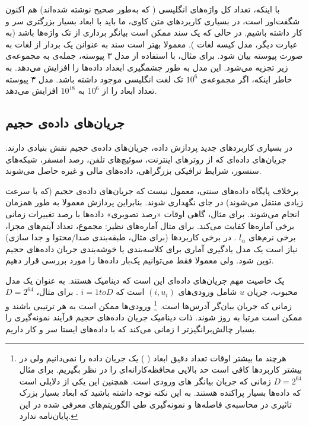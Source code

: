 با اینکه، تعداد کل واژه‌های انگلیسی ( که به‌طور صحیح نوشته شده‌اند) هم اکنون شگفت‌اور است، در بسیاری کاربردهای متن کاوی، ما باید با ابعاد بسیار بزرگتری سر و کار داشته باشیم. در حالی که یک سند ممکن است بیانگر برداری از تک واژه‌ها باشد (به عبارت دیگر، مدل کیسه لغات
). معمولا بهتر است سند به عنوانن یک بردار از لغات به صورت 
پیوسته 
\cite{litez34}
بیان شود. برای مثال، با استفاده از مدل ۳ پیوسته، جمله‌ی
به مجموعه‌ی زیر تجزیه می‌شود. 
این مدل به طور جشمگیری ابعداد داده‌ها را افزایش می‌دهد. به خاطر اینکه، اگر مجموعه‌ی 
$10^6$
تک لغت انگلیسی موجود داشته باشد. مدل ۳ پیوسته تعداد ابعاد را از 
$10^6$
به 
$10^{18}$
افزایش می‌دهد.

\subsection{
جریان‌های داده‌ی حجیم
}
در بسیاری کاربردهای جدید پردازش داده، جریان‌های داده‌ی حجیم نقش بنیادی دارند. جریان‌های داده‌ای که از روترهای اینترنت، سوئیچ‌های تلفن، رصد امسفر، شبکه‌های سنسور، شرایط ترافیکی بزرگراهی، داده‌های مالی و غیره 
\cite{litez5, litez141, litez49, litez19, litez96, litez69, litez91}
حاصل می‌شوند.

برخلاف پایگاه‌ داده‌های سنتی، معمول نیست که جریان‌های داده‌ی حجیم (که با سرعت زیادی منتقل می‌شوند) در جای نگهداری شوند. بنابراین پردازش معمولا به طور همزمان انجام می‌شوند. برای مثال، گاهی اوقات «رصد تصویری» داده‌ها با رصد تغییرات زمانی برخی آماره‌ها کفایت می‌کند. برای مثال آماره‌های نظیر: مجموع، تعداد آیتم‌های مجزا، برخی نرم‌های 
$l_\alpha$
. در برخی کاربردها (برای مثال، طبقه‌بندی صدا/محتوا و جدا سازی) نیاز است یک مدل یادگیری آماری برای کلاسه‌بندی
یا خوشه‌بندی
جریان داده‌های حجیم توین شود. ولی معمولا فقط می‌توانیم یک‌بار داده‌ها را مورد بررسی قرار دهیم.

یک خاصیت مهم جریان‌های داده‌ای این است که دینامیک هستند. به عنوان یک مدل محبوب، جریان 
$u$
شامل ورودی‌های 
$(i, u_i)$
است که 
$i = 1 to D$
. برای مثال،
$D = 2^{64}$
زمانی که جریان بیان‌گر 
آدرس‌ها است.
\footnote{
هرچند ما بیشتر اوقات تعداد دقیق ابعاد (
) یک جریان داده را نمی‌دانیم ولی در بیشتر کاربردها کافی است حد بالایی محافظه‌کارانه‌ای را در نظر بگیریم. برای مثال 
$D = 2^{64}$
زمانی که جریان بیانگر 
های ورودی است. همچنین این یکی از دلایلی است که داده‌ها بسیار پراکنده هستند. به این نکته توجه داشته باشید که ابعاد بسیار بزرک تاثیری در محاسبه‌ی فاصله‌ها و نمونه‌گیری طی الگوریتم‌های معرفی شده در این پایان‌نامه ندارد.
}
ورودی‌ها ممکن است به هر ترتیبی باشند و ممکن است مرتبا به روز شوند. ذات دینامیک جریان داده‌های حجیم فرآیند نمونه‌گیری را بسیار چالش‌برانگیزتر ا زمانی ‌می‌کند که با داده‌های ایستا سر و کار داریم.

